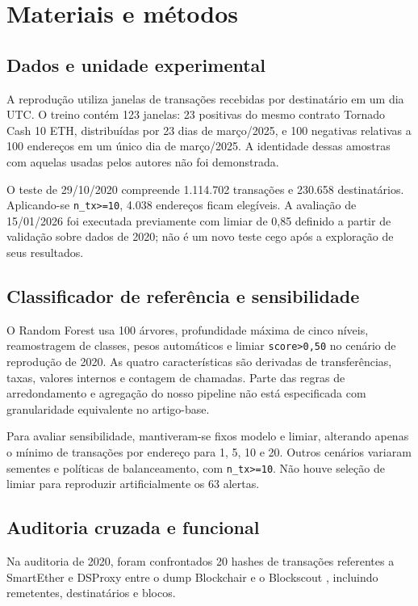 \documentclass[11pt,a4paper]{article}
\begin{document}
\section{Materiais e métodos}
\subsection{Dados e unidade experimental}
A reprodução utiliza janelas de transações recebidas por destinatário em um dia UTC. O treino contém 123 janelas: 23 positivas do mesmo contrato Tornado Cash 10 ETH, distribuídas por 23 dias de março/2025, e 100 negativas relativas a 100 endereços em um único dia de março/2025. A identidade dessas amostras com aquelas usadas pelos autores não foi demonstrada.

O teste de 29/10/2020 compreende 1.114.702 transações e 230.658 destinatários. Aplicando-se \texttt{n\_tx>=10}, 4.038 endereços ficam elegíveis. A avaliação de 15/01/2026 foi executada previamente com limiar de 0,85 definido a partir de validação sobre dados de 2020; não é um novo teste cego após a exploração de seus resultados.

\subsection{Classificador de referência e sensibilidade}
O Random Forest usa 100 árvores, profundidade máxima de cinco níveis, reamostragem de classes, pesos automáticos e limiar \texttt{score>0,50} no cenário de reprodução de 2020. As quatro características são derivadas de transferências, taxas, valores internos e contagem de chamadas. Parte das regras de arredondamento e agregação do nosso pipeline não está especificada com granularidade equivalente no artigo-base.

Para avaliar sensibilidade, mantiveram-se fixos modelo e limiar, alterando apenas o mínimo de transações por endereço para 1, 5, 10 e 20. Outros cenários variaram sementes e políticas de balanceamento, com \texttt{n\_tx>=10}. Não houve seleção de limiar para reproduzir artificialmente os 63 alertas.

\subsection{Auditoria cruzada e funcional}
Na auditoria de 2020, foram confrontados 20 hashes de transações referentes a SmartEther e DSProxy entre o dump Blockchair \citep{blockchair} e o Blockscout \citep{blockscout}, incluindo remetentes, destinatários e blocos.
\end{document}
